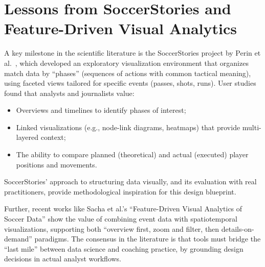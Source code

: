 \documentclass[11pt,a4paper,openright]{report}
\begin{document}
\section*{Lessons from SoccerStories and Feature-Driven Visual Analytics}
A key milestone in the scientific literature is the SoccerStories project by Perin et al.\ \cite{perin2013soccerstories}, which developed an exploratory visualization environment that organizes match data by “phases” (sequences of actions with common tactical meaning), using faceted views tailored for specific events (passes, shots, runs). User studies found that analysts and journalists value:
\begin{itemize}
    \item Overviews and timelines to identify phases of interest;
    \item Linked visualizations (e.g., node-link diagrams, heatmaps) that provide multi-layered context;
    \item The ability to compare planned (theoretical) and actual (executed) player positions and movements.
\end{itemize}
SoccerStories’ approach to structuring data visually, and its evaluation with real practitioners, provide methodological inspiration for this design blueprint.

Further, recent works like Sacha et al.'s “Feature-Driven Visual Analytics of Soccer Data” \cite{sacha2014feature} show the value of combining event data with spatiotemporal visualizations, supporting both “overview first, zoom and filter, then details-on-demand” paradigms. The consensus in the literature is that tools must bridge the “last mile” between data science and coaching practice, by grounding design decisions in actual analyst workflows.

\end{document}
